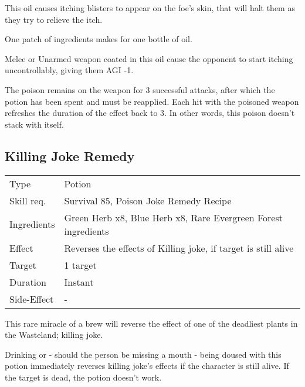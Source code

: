 \documentclass[11pt,a4paper,twocolumn]{book}
\begin{document}
\medskip

This oil causes itching blisters to appear on the foe's skin, that will halt them as they try to relieve the itch.

One patch of ingredients makes for one bottle of oil.

Melee or Unarmed weapon coated in this oil cause the opponent to start itching uncontrollably, giving them AGI -1.

The poison remains on the weapon for 3 successful attacks, after which the potion has been spent and must be reapplied. Each hit with the poisoned weapon refreshes the duration of the effect back to 3. In other words, this poison doesn't stack with itself.


\subsection*{Killing Joke Remedy}
{
	\begin{tabu} to 75mm{| X[l,4] | X[l,8] |}
		\hline
		Type 			& Potion 															\\
		Skill req.	    & Survival 85, Poison Joke Remedy Recipe 							\\
		Ingredients     & Green Herb x8, Blue Herb x8, Rare Evergreen Forest ingredients	\\
		Effect     		& Reverses the effects of Killing joke, if target is still alive 	\\
		Target      	& 1 target															\\
		Duration  		& Instant	 														\\
		Side-Effect     & -																	\\ \hline
	\end{tabu}
	
}

\medskip

This rare miracle of a brew will reverse the effect of one of the deadliest plants in the Wasteland; killing joke.

Drinking or -  should the person be missing a mouth - being doused with this potion immediately reverses killing joke's effects if the character is still alive. If the target is dead, the potion doesn't work.
\end{document}
